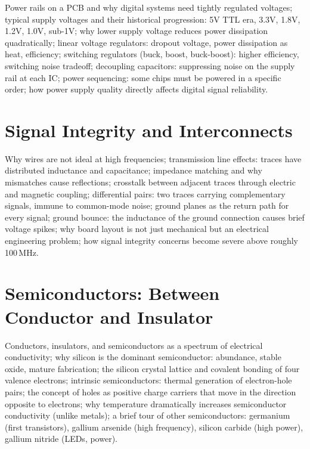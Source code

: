 Power rails on a PCB and why digital systems need tightly regulated voltages;
typical supply voltages and their historical progression: 5V TTL era,
3.3V, 1.8V, 1.2V, 1.0V, sub-1V; why lower supply voltage reduces power
dissipation quadratically; linear voltage regulators: dropout voltage,
power dissipation as heat, efficiency; switching regulators (buck, boost,
buck-boost): higher efficiency, switching noise tradeoff; decoupling
capacitors: suppressing noise on the supply rail at each IC; power
sequencing: some chips must be powered in a specific order; how power
supply quality directly affects digital signal reliability.

\chapter{Signal Integrity and Interconnects}
\label{ch:signal-integrity-pcb}

Why wires are not ideal at high frequencies; transmission line effects:
traces have distributed inductance and capacitance; impedance matching and
why mismatches cause reflections; crosstalk between adjacent traces through
electric and magnetic coupling; differential pairs: two traces carrying
complementary signals, immune to common-mode noise; ground planes as the
return path for every signal; ground bounce: the inductance of the ground
connection causes brief voltage spikes; why board layout is not just
mechanical but an electrical engineering problem; how signal integrity
concerns become severe above roughly 100\,MHz.



\chapter{Semiconductors: Between Conductor and Insulator}
\label{ch:semiconductors-intro}

Conductors, insulators, and semiconductors as a spectrum of electrical
conductivity; why silicon is the dominant semiconductor: abundance, stable
oxide, mature fabrication; the silicon crystal lattice and covalent bonding
of four valence electrons; intrinsic semiconductors: thermal generation of
electron-hole pairs; the concept of holes as positive charge carriers that
move in the direction opposite to electrons; why temperature dramatically
increases semiconductor conductivity (unlike metals); a brief tour of other
semiconductors: germanium (first transistors), gallium arsenide (high
frequency), silicon carbide (high power), gallium nitride (LEDs, power).

